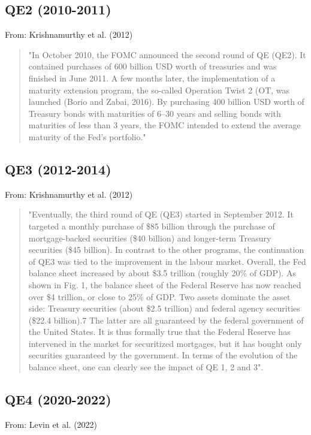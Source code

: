 \subsection{QE2 (2010-2011)}
From: Krishnamurthy et al. (2012)
\begin{quote}
"In October 2010, the FOMC announced the second round of QE (QE2). It contained purchases of 600 billion USD worth of treasuries and was finished in June 2011. A few months later, the implementation of a maturity extension program, the so-called Operation Twist 2 (OT, was launched (Borio and Zabai, 2016). By purchasing 400 billion USD worth of Treasury bonds with maturities of 6–30 years and selling bonds with maturities of less than 3 years, the FOMC intended to extend the average maturity of the Fed’s portfolio."
\end{quote}
\subsection{QE3 (2012-2014)}
From: Krishnamurthy et al. (2012)
\begin{quote}
"Eventually, the third round of QE (QE3) started in September 2012. It targeted a monthly purchase of \$85 billion through the purchase of mortgage-backed securities (\$40 billion) and longer-term Treasury securities (\$45 billion). In contrast to the other programs, the continuation of QE3 was tied to the improvement in the labour market. Overall, the Fed balance sheet increased by about \$3.5 trillion (roughly 20\% of GDP). As shown in Fig. 1, the balance sheet of the Federal Reserve has now reached over \$4 trillion, or close to 25\% of GDP. Two assets dominate the asset side: Treasury securities (about \$2.5 trillion) and federal agency securities (\$22.4 billion).7 The latter are all guaranteed by the federal government of the United States. It is thus formally true that the Federal Reserve has intervened in the market for securitized mortgages, but it has bought only securities guaranteed by the government. In terms of the evolution of the balance sheet, one can clearly see the impact of QE 1, 2 and 3".
\end{quote}
\subsection{QE4 (2020-2022)}
From: Levin et al. (2022)

